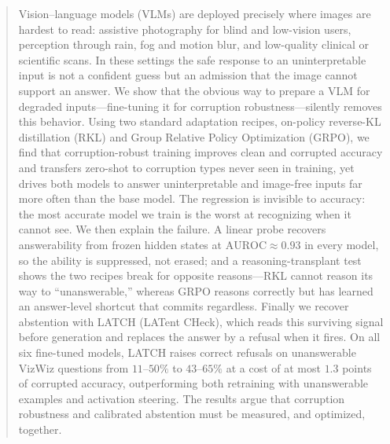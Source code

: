 \begin{abstract}
Vision--language models (VLMs) are deployed precisely where images are hardest to
read: assistive photography for blind and low-vision users, perception through rain,
fog and motion blur, and low-quality clinical or scientific scans. In these settings
the safe response to an uninterpretable input is not a confident guess but an
admission that the image cannot support an answer. We show that the obvious way to
prepare a VLM for degraded inputs---fine-tuning it for corruption robustness---silently
removes this behavior. Using two standard adaptation recipes, on-policy reverse-KL
distillation (RKL) and Group Relative Policy Optimization (GRPO), we find that
corruption-robust training improves clean and corrupted accuracy and transfers
zero-shot to corruption types never seen in training, yet drives both models to
answer uninterpretable and image-free inputs far more often than the base model.
The regression is invisible to accuracy: the most accurate model we train is the
worst at recognizing when it cannot see. We then explain the failure. A linear probe
recovers answerability from frozen hidden states at $\mathrm{AUROC}\approx0.93$ in every
model, so the ability is suppressed, not erased; and a reasoning-transplant test shows
the two recipes break for opposite reasons---RKL cannot reason its way to
``unanswerable,'' whereas GRPO reasons correctly but has learned an answer-level
shortcut that commits regardless. Finally we recover abstention with LATCH (LATent
CHeck), which reads this surviving signal before generation and replaces the answer by a
refusal when it fires. On all six fine-tuned models, LATCH raises correct refusals on
unanswerable VizWiz questions from $11$--$50\%$ to $43$--$65\%$ at a cost of at most
$1.3$ points of corrupted accuracy, outperforming both retraining with unanswerable
examples and activation steering. The results argue that corruption robustness and
calibrated abstention must be measured, and optimized, together.
\end{abstract}
